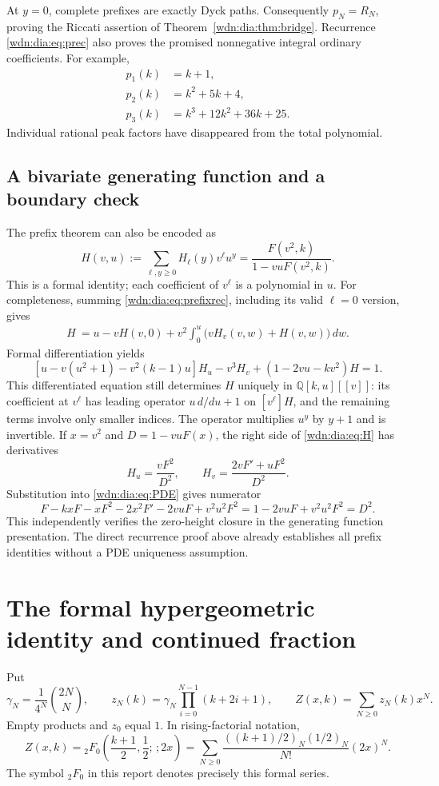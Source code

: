 \documentclass[11pt,letterpaper]{article}
\theoremstyle{remark}\newtheorem{remark}[theorem]{Remark}
\newcommand{\Q}{\mathbb Q}
\begin{document}
At $y=0$, complete prefixes are exactly Dyck paths. Consequently
$p_N=R_N$, proving the Riccati assertion of Theorem~\ref{wdn:dia:thm:bridge}.
Recurrence \eqref{wdn:dia:eq:prec} also proves the promised nonnegative integral
ordinary coefficients. For example,
\begin{align*}
 p_1(k)&=k+1,\\
 p_2(k)&=k^2+5k+4,\\
 p_3(k)&=k^3+12k^2+36k+25.
\end{align*}
Individual rational peak factors have disappeared from the total polynomial.

\subsection{A bivariate generating function and a boundary check}
The prefix theorem can also be encoded as
\begin{equation}\label{wdn:dia:eq:H}
 H(v,u):=\sum_{\ell,y\ge0}H_\ell(y)v^\ell u^y
 =\frac{F(v^2,k)}{1-vuF(v^2,k)}.
\end{equation}
This is a formal identity; each coefficient of $v^\ell$ is a polynomial in
$u$. For completeness, summing \eqref{wdn:dia:eq:prefixrec}, including its valid
$\ell=0$ version, gives
\begin{multline*}
 [u-v(u^2+1)-v^2(k-1)u]H\
 =u-vH(v,0)+v^2\int_0^u\bigl(vH_v(v,w)+H(v,w)\bigr)\,dw.
\end{multline*}
Formal differentiation yields
\begin{equation}\label{wdn:dia:eq:PDE}
 [u-v(u^2+1)-v^2(k-1)u]H_u-v^3H_v
 +(1-2vu-kv^2)H=1.
\end{equation}
This differentiated equation still determines $H$ uniquely in
$\Q[k,u][[v]]$: its coefficient at $v^\ell$ has leading operator
$u\,d/du+1$ on $[v^\ell]H$, and the remaining terms involve only smaller
indices. The operator multiplies $u^y$ by $y+1$ and is invertible.
If $x=v^2$ and $D=1-vuF(x)$, the right side of \eqref{wdn:dia:eq:H} has derivatives
\[
 H_u=\frac{vF^2}{D^2},\qquad
 H_v=\frac{2vF'+uF^2}{D^2}.
\]
Substitution into \eqref{wdn:dia:eq:PDE} gives numerator
\[
 F-kxF-xF^2-2x^2F'-2vuF+v^2u^2F^2
 =1-2vuF+v^2u^2F^2=D^2.
\]
This independently verifies the zero-height closure in the generating
function presentation. The direct recurrence proof above already establishes
all prefix identities without a PDE uniqueness assumption.

\section{The formal hypergeometric identity and continued fraction}
Put
\begin{equation}\label{wdn:dia:eq:zdef}
 \gamma_N=\frac1{4^N}\binom{2N}{N},\qquad
 z_N(k)=\gamma_N\prod_{i=0}^{N-1}(k+2i+1),\qquad Z(x,k)=\sum_{N\ge0}z_N(k)x^N.
\end{equation}
Empty products and $z_0$ equal $1$. In rising-factorial notation,
\begin{equation}\label{wdn:dia:eq:2F0}
 Z(x,k)={}_2F_0\left(\frac{k+1}{2},\frac12;\,;2x\right)
 =\sum_{N\ge0}\frac{((k+1)/2)_N(1/2)_N}{N!}(2x)^N.
\end{equation}
The symbol ${}_2F_0$ in this report denotes precisely this formal series.
\end{document}

